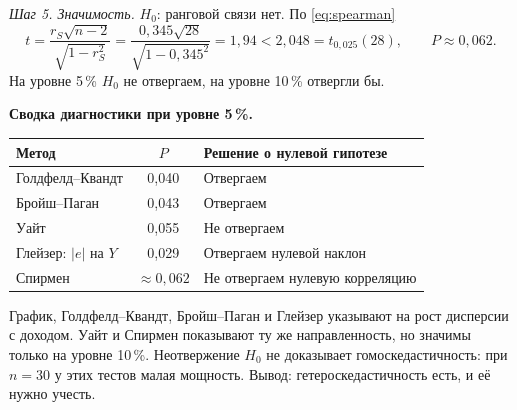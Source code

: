 \begin{solution}
\smallskip
\emph{Шаг 5. Значимость.} $H_0$: ранговой связи нет. По \eqref{eq:spearman}
\[
  t = \frac{r_S\sqrt{n-2}}{\sqrt{1 - r_S^2}}
    = \frac{0{,}345\sqrt{28}}{\sqrt{1 - 0{,}345^2}} = 1{,}94 < 2{,}048 = t_{0{,}025}(28),
  \qquad P \approx 0{,}062 .
\]
На уровне 5\,\% $H_0$ не отвергаем, на уровне 10\,\% отвергли бы.

\smallskip
\textbf{Сводка диагностики при уровне 5\,\%.}
\begin{center}
\begin{tabular}{lcl}
\toprule
Метод & $P$ & Решение о нулевой гипотезе \\
\midrule
Голдфелд--Квандт & 0,040 & Отвергаем \\
Бройш--Паган & 0,043 & Отвергаем \\
Уайт & 0,055 & Не отвергаем \\
Глейзер: $|e|$ на $Y$ & 0,029 & Отвергаем нулевой наклон \\
Спирмен & $\approx0{,}062$ & Не отвергаем нулевую корреляцию \\
\bottomrule
\end{tabular}
\end{center}
График, Голдфелд--Квандт, Бройш--Паган и Глейзер указывают на рост
дисперсии с доходом. Уайт и Спирмен показывают ту же направленность, но
значимы только на уровне 10\,\%. Неотвержение $H_0$ не доказывает
гомоскедастичность: при $n = 30$ у этих тестов малая мощность. Вывод:
гетероскедастичность есть, и её нужно учесть.


\end{solution}
